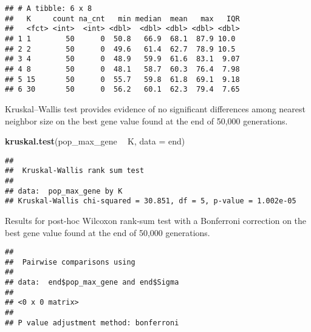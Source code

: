 \documentclass[]{book}
\newenvironment{Shaded}{\begin{snugshade}}{\end{snugshade}}
\newcommand{\DataTypeTok}[1]{\textcolor[rgb]{0.13,0.29,0.53}{#1}}
\newcommand{\KeywordTok}[1]{\textcolor[rgb]{0.13,0.29,0.53}{\textbf{#1}}}
\newcommand{\NormalTok}[1]{#1}
\newcommand{\OperatorTok}[1]{\textcolor[rgb]{0.81,0.36,0.00}{\textbf{#1}}}
\newcommand{\OtherTok}[1]{\textcolor[rgb]{0.56,0.35,0.01}{#1}}
\newcommand{\StringTok}[1]{\textcolor[rgb]{0.31,0.60,0.02}{#1}}
\begin{document}
\begin{verbatim}
## # A tibble: 6 x 8
##   K     count na_cnt   min median  mean   max   IQR
##   <fct> <int>  <int> <dbl>  <dbl> <dbl> <dbl> <dbl>
## 1 1        50      0  50.8   66.9  68.1  87.9 10.0 
## 2 2        50      0  49.6   61.4  62.7  78.9 10.5 
## 3 4        50      0  48.9   59.9  61.6  83.1  9.07
## 4 8        50      0  48.1   58.7  60.3  76.4  7.98
## 5 15       50      0  55.7   59.8  61.8  69.1  9.18
## 6 30       50      0  56.2   60.1  62.3  79.4  7.65
\end{verbatim}

Kruskal--Wallis test provides evidence of no significant differences among nearest neighbor size on the best gene value found at the end of 50,000 generations.

\begin{Shaded}
\begin{Highlighting}[]
\KeywordTok{kruskal.test}\NormalTok{(pop_max_gene }\OperatorTok{~}\StringTok{ }\NormalTok{K, }\DataTypeTok{data =}\NormalTok{ end)}
\end{Highlighting}
\end{Shaded}

\begin{verbatim}
## 
##  Kruskal-Wallis rank sum test
## 
## data:  pop_max_gene by K
## Kruskal-Wallis chi-squared = 30.851, df = 5, p-value = 1.002e-05
\end{verbatim}

Results for post-hoc Wilcoxon rank-sum test with a Bonferroni correction on the best gene value found at the end of 50,000 generations.

\begin{Shaded}
\end{Shaded}

\begin{verbatim}
## 
##  Pairwise comparisons using 
## 
## data:  end$pop_max_gene and end$Sigma 
## 
## <0 x 0 matrix>
## 
## P value adjustment method: bonferroni
\end{verbatim}


\end{document}

